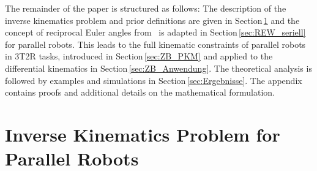 \documentclass[robotics,article,accept,moreauthors,pdftex]{Definitions/mdpi}
\begin{document}

The remainder of the paper is structured as follows:
The description of the inverse kinematics problem and prior definitions are given in Section\,\ref{sec:PKM_general} and the concept of reciprocal Euler angles from~ \cite{1_SchapplerTapOrt2019} is adapted in Section\,\ref{sec:REW_seriell} for parallel robots.
This leads to the full kinematic constraints of parallel robots in 3T2R tasks, introduced in Section\,\ref{sec:ZB_PKM} and applied to the differential kinematics in Section\,\ref{sec:ZB_Anwendung}.
The theoretical analysis is followed by examples and simulations in Section\,\ref{sec:Ergebnisse}.
The appendix contains proofs and additional details on the mathematical formulation.

\section{Inverse Kinematics Problem for Parallel Robots}
\label{sec:PKM_general}
\end{document}
